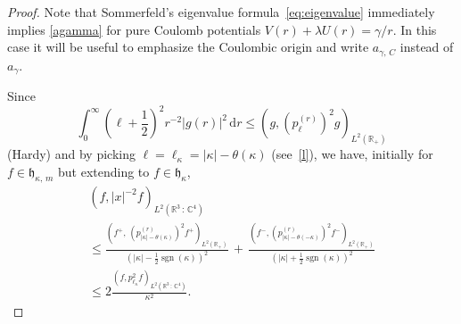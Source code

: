 \documentclass[10pt]{amsart}
\theoremstyle{definition}
\DeclareMathOperator{\sgn}{sgn}
\newcommand*\dr{\mathrm{d}r}
\newcommand*\cz{\mathbb{C}}
\newcommand*\rz{\mathbb{R}}
\newcommand*\gh{\mathfrak{h}}
\begin{document}
\begin{proof}
Note that Sommerfeld's eigenvalue formula~\eqref{eq:eigenvalue} immediately implies \eqref{agamma} for pure Coulomb potentials $V(r)+\lambda U(r)=\gamma/r$. In this case it will be useful to emphasize the Coulombic origin and write $a_{\gamma,\,C}$ instead of $a_\gamma$.

Since
\[
\int_0^\infty\left(\ell+\frac12\right)^2r^{-2}|g(r)|^2\,\dr \leq \left(g,\left(p_\ell^{(r)}\right)^2g\right)_{L^2\left(\rz_+\right)}
\]
(Hardy) and by picking $\ell=\ell_\kappa=|\kappa|-\theta(\kappa)$ (see~\eqref{l}), we have, initially for $f\in\gh_{\kappa,\,m}$ but extending to $f\in\gh_\kappa$,
\begin{multline}\label{eq:hardyang}
\left(f,|x|^{-2}f\right)_{L^2\left(\rz^3\,:\,\cz^4\right)}\\
\leq \frac{\left(f^+,\,\left(p_{|\kappa|-\theta(\kappa)}^{(r)}\right)^2f^+\right)_{L^2\left(\rz_+\right)}
}{\left(|\kappa|-\frac12\sgn(\kappa)\right)^2}\,+ \,\frac{\left(f^-,\left(p_{|\kappa|-\theta(-\kappa)}^{(r)}\right)^2f^-\right)_{L^2\left(\rz_+\right)}}{\left(|\kappa|+\frac12\sgn(\kappa)\right)^2}\\
\leq 2\frac{\left(f,p_{\ell_\kappa}^2 f\right)_{L^2\left(\rz^3\,:\,\cz^4\right)}}{
\kappa^2}.
\end{multline}



\end{proof}
\end{document}
